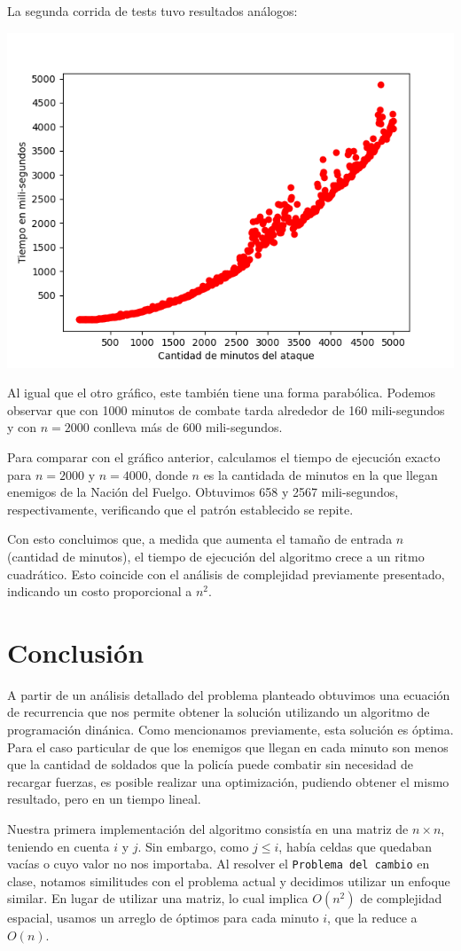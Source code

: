 \documentclass{article}
\begin{document}
La segunda corrida de tests tuvo resultados análogos:

\includegraphics[scale=0.69]{graficoComplejidad.png}

Al igual que el otro gráfico, este también tiene una forma parabólica. Podemos observar que con 1000 minutos de combate tarda alrededor de 160 mili-segundos y con $n = 2000$ conlleva más de 600 mili-segundos. 

Para comparar con el gráfico anterior, calculamos el tiempo de ejecución exacto para $n = 2000$ y $n = 4000$, donde $n$ es la cantidada de minutos en la que llegan enemigos de la Nación del Fuelgo. Obtuvimos 658 y 2567 mili-segundos, respectivamente, verificando que el patrón establecido se repite.

Con esto concluimos que, a medida que aumenta el tamaño de entrada $n$ (cantidad de minutos), el tiempo de ejecución del algoritmo crece a un ritmo cuadrático. Esto coincide con el análisis de complejidad previamente presentado, indicando un costo proporcional a $n^2$.

\section{Conclusión}

A partir de un análisis detallado del problema planteado obtuvimos una ecuación de recurrencia que nos permite obtener la solución utilizando un algoritmo de programación dinánica. Como mencionamos previamente, esta solución es óptima. Para el caso particular de que los enemigos que llegan en cada minuto son menos que la cantidad de soldados que la policía puede combatir sin necesidad de recargar fuerzas, es posible realizar una optimización, pudiendo obtener el mismo resultado, pero en un tiempo lineal.

Nuestra primera implementación del algoritmo consistía en una matriz de $n \times n$, teniendo en cuenta $i$ y $j$. Sin embargo, como $j \leq i$, había celdas que quedaban vacías o cuyo valor no nos importaba. Al resolver el \texttt{Problema\ del\ cambio} en clase, notamos similitudes con el problema actual y decidimos utilizar un enfoque similar. En lugar de utilizar una matriz, lo cual implica $O(n^2)$ de complejidad espacial, usamos un arreglo de óptimos para cada minuto $i$, que la reduce a $O(n)$. 
\end{document}
